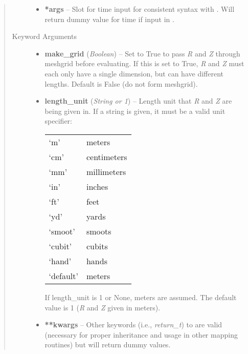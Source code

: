 \documentclass[letterpaper,10pt,english]{sphinxmanual}
\begin{document}
\begin{fulllineitems}
\begin{fulllineitems}
\begin{quote}
\begin{description}
\begin{itemize}
\item {} 
\textbf{*args} --
Slot for time input for consistent syntax with
.  Will return dummy value for time
if input in {\hyperref[eqtools:eqtools.eqdskreader.EqdskReader]{}}.

\end{itemize}

\item[{Keyword Arguments}] \leavevmode\begin{itemize}
\item {} 
\textbf{make\_grid} (\emph{Boolean}) --
Set to True to pass \emph{R} and \emph{Z} through
meshgrid before evaluating. If this is set to True, \emph{R} and \emph{Z}
must each only have a single dimension, but can have different
lengths.  Default is False (do not form meshgrid).

\item {} 
\textbf{length\_unit} (\emph{String or 1}) --
Length unit that \emph{R} and \emph{Z} are being
given in. If a string is given, it must be a valid unit
specifier:

\begin{tabulary}{\linewidth}{|L|L|}
\hline

`m'
 & 
meters
\\

`cm'
 & 
centimeters
\\

`mm'
 & 
millimeters
\\

`in'
 & 
inches
\\

`ft'
 & 
feet
\\

`yd'
 & 
yards
\\

`smoot'
 & 
smoots
\\

`cubit'
 & 
cubits
\\

`hand'
 & 
hands
\\

`default'
 & 
meters
\\
\hline\end{tabulary}


If length\_unit is 1 or None, meters are assumed. The default
value is 1 (\emph{R} and \emph{Z} given in meters).

\item {} 
\textbf{**kwargs} --
Other keywords (i.e., \emph{return\_t}) to {\hyperref[eqtools:eqtools.eqdskreader.EqdskReader.rz2psi]{}} are
valid (necessary for proper inheritance and usage in other
mapping routines) but will return dummy values.


\end{itemize}
\end{description}
\end{quote}
\end{fulllineitems}
\end{fulllineitems}
\end{document}
